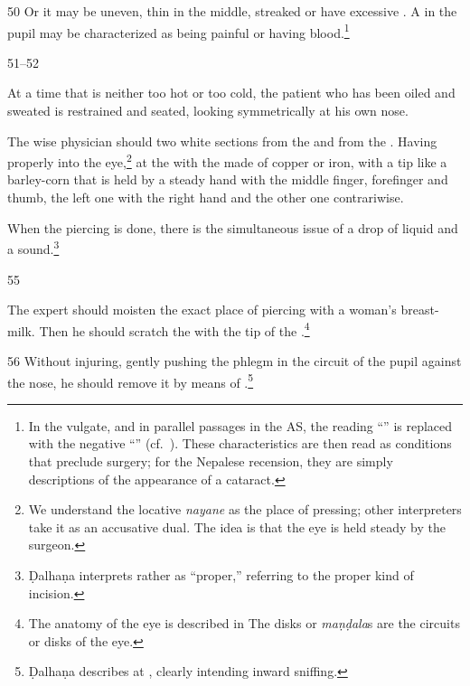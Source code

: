 \begin{translation}
    \item [50] Or it may be uneven, thin in the middle, streaked or have excessive
    . A  in the pupil may be characterized as being
    painful or having blood.\footnote{In the vulgate, and in parallel passages in the
    AS, the reading “” is replaced with the negative “” (cf.\ ).   These characteristics are then
    read as conditions that preclude surgery;  for the Nepalese recension, they are
    simply descriptions of the appearance of a cataract.}
    
    \item [51--52]
    
    At a time that is neither too hot or too cold, 
    the patient who has been oiled and sweated
    is restrained and seated, looking symmetrically at his own nose.
    
    The wise physician should  two white sections from the
     and from the . Having
     properly into the eye,\footnote{We 
    understand the
    locative \emph{nayane} as the place of pressing; other interpreters take it as an
    accusative dual.  The idea is that the eye is held steady by the surgeon.} at the
      with the 
    made of copper or iron, with a tip like a barley-corn that is held by a steady
    hand with the middle finger, forefinger and thumb,
    the left one with the right hand and the other one contrariwise.
    
    When the piercing is done, there is the simultaneous issue of a drop of liquid and a 
    sound.\footnote{Ḍalhaṇa interprets  rather as “proper,” 
    referring to the proper kind of incision.}
    
    \item [55]
    
    The expert should moisten the exact place of piercing  with a woman's breast-milk.  Then 
    he 
    should scratch the  with the tip of the 
    .\footnote{The anatomy of the eye is described in 
    The disks or 
    \emph{maṇḍala}s are the circuits or disks of the eye.}
    
    \item[56]
    Without injuring, gently pushing the phlegm in the circuit of the pupil against the nose, he 
    should remove it by means of .\footnote{Ḍalhaṇa describes 
     at 
    , clearly intending inward sniffing.}
    

\end{translation}
